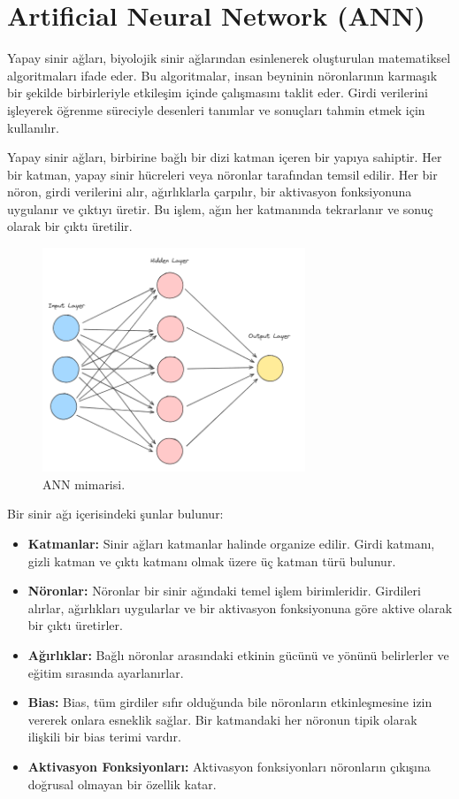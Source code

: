 \section{Artificial Neural Network (ANN)}
Yapay sinir ağları, biyolojik sinir ağlarından esinlenerek oluşturulan matematiksel algoritmaları ifade eder. Bu algoritmalar, insan beyninin nöronlarının karmaşık bir şekilde birbirleriyle etkileşim içinde çalışmasını taklit eder. Girdi verilerini işleyerek öğrenme süreciyle desenleri tanımlar ve sonuçları tahmin etmek için kullanılır.

Yapay sinir ağları, birbirine bağlı bir dizi katman içeren bir yapıya sahiptir. Her bir katman, yapay sinir hücreleri veya nöronlar tarafından temsil edilir. Her bir nöron, girdi verilerini alır, ağırlıklarla çarpılır, bir aktivasyon fonksiyonuna uygulanır ve çıktıyı üretir. Bu işlem, ağın her katmanında tekrarlanır ve sonuç olarak bir çıktı üretilir.

\begin{figure}[ht]
    \centering
    \includegraphics[width=0.7\textwidth]{images/ann_architecture.png}
    \caption{ANN mimarisi.}
    \label{fig:enter-label}
\end{figure}

Bir sinir ağı içerisindeki şunlar bulunur:

\begin{itemize}
	\item \textbf{Katmanlar:} Sinir ağları katmanlar halinde organize edilir. Girdi katmanı, gizli katman ve çıktı katmanı olmak üzere üç katman türü bulunur.
	\item \textbf{Nöronlar:} Nöronlar bir sinir ağındaki temel işlem birimleridir. Girdileri alırlar, ağırlıkları uygularlar ve bir aktivasyon fonksiyonuna göre aktive olarak bir çıktı üretirler.
	\item \textbf{Ağırlıklar:} Bağlı nöronlar arasındaki etkinin gücünü ve yönünü belirlerler ve eğitim sırasında ayarlanırlar.
	\item \textbf{Bias:} Bias, tüm girdiler sıfır olduğunda bile nöronların etkinleşmesine izin vererek onlara esneklik sağlar. Bir katmandaki her nöronun tipik olarak ilişkili bir bias terimi vardır.
	\item \textbf{Aktivasyon Fonksiyonları:} Aktivasyon fonksiyonları nöronların çıkışına doğrusal olmayan bir özellik katar.
\end{itemize}

